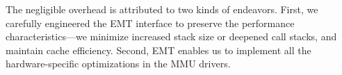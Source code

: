 
The negligible overhead is attributed to two kinds of endeavors.
First, we carefully engineered the EMT interface to preserve the 
	performance characteristics---we minimize increased stack size or deepened
	call stacks, and maintain cache efficiency.
Second, EMT enables us to implement all the hardware-specific optimizations in the MMU drivers.



